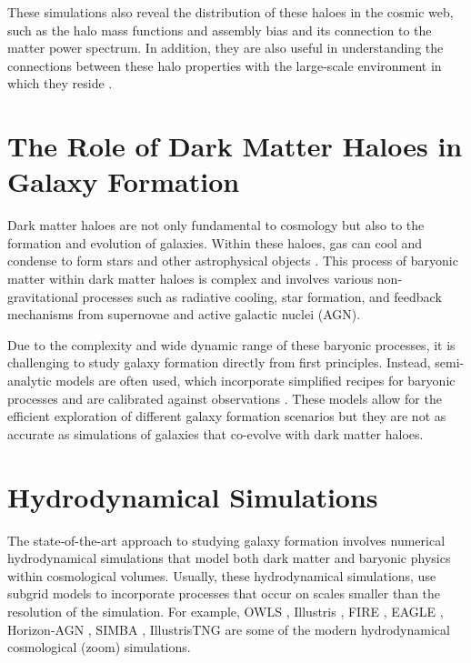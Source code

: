 These simulations also reveal the distribution of these haloes in the cosmic web, such as the halo mass functions and assembly bias and its connection to the matter power spectrum. In addition, they are also useful in understanding the connections between these halo properties with the large-scale environment in which they reside \cite[see e.g.][]{2021MNRAS.503.2053R,2022MNRAS.516.5849R}.

\section{The Role of Dark Matter Haloes in Galaxy Formation}

Dark matter haloes are not only fundamental to cosmology but also to the formation and evolution of galaxies. Within these haloes, gas can cool and condense to form stars and other astrophysical objects \citep{1988MNRAS.234..459S,1998MNRAS.295..319M}. This process of baryonic matter within dark matter haloes is complex and involves various non-gravitational processes such as radiative cooling, star formation, and feedback mechanisms from supernovae and active galactic nuclei (AGN).

Due to the complexity and wide dynamic range of these baryonic processes, it is challenging to study galaxy formation directly from first principles. Instead, semi-analytic models are often used, which incorporate simplified recipes for baryonic processes and are calibrated against observations \citep{2015ARA&A..53...51S}. These models allow for the efficient exploration of different galaxy formation scenarios but they are not as accurate as simulations of galaxies that co-evolve with dark matter haloes.

\section{Hydrodynamical Simulations}

The state-of-the-art approach to studying galaxy formation involves numerical hydrodynamical simulations that model both dark matter and baryonic physics within cosmological volumes. Usually, these hydrodynamical simulations, use subgrid models to incorporate processes that occur on scales smaller than the resolution of the simulation. For example, OWLS \citep{2010MNRAS.402.1536S}, Illustris \citep{2014MNRAS.445..175G}, FIRE \citep{2014MNRAS.445..581H}, EAGLE \citep{2015MNRAS.446..521S}, Horizon-AGN \citep[][]{2017MNRAS.467.4739K}, SIMBA \citep[][]{2019MNRAS.486.2827D}, IllustrisTNG \citep{2019ComAC...6....2N} are some of the modern hydrodynamical cosmological (zoom) simulations.

